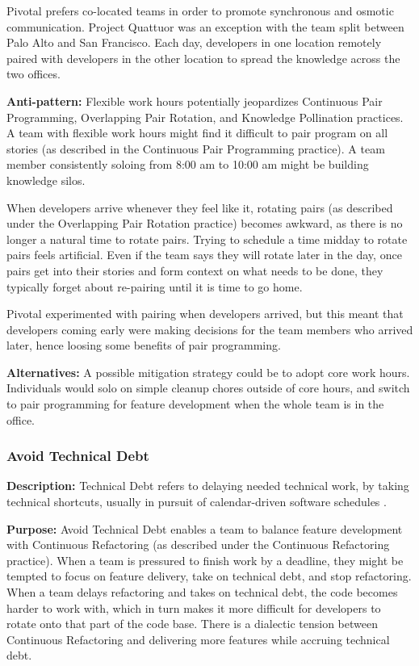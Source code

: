Pivotal prefers co-located teams in order to promote synchronous and osmotic communication. Project Quattuor was an exception with the team split between Palo Alto and San Francisco. Each day, developers in one location remotely paired with developers in the other location to spread the knowledge across the two offices.

\textbf{Anti-pattern:} Flexible work hours potentially jeopardizes Continuous Pair Programming, Overlapping Pair Rotation, and Knowledge Pollination practices. A team with flexible work hours might find it difficult to pair program on all stories (as described in the Continuous Pair Programming practice). A team member consistently soloing from 8:00 am to 10:00 am might be building knowledge silos. 

When developers arrive whenever they feel like it, rotating pairs (as described under the Overlapping Pair Rotation practice) becomes awkward, as there is no longer a natural time to rotate pairs. Trying to schedule a time midday to rotate pairs feels artificial. Even if the team says they will rotate later in the day, once pairs get into their stories and form context on what needs to be done, they typically forget about re-pairing until it is time to go home.

Pivotal experimented with pairing when developers arrived, but this meant that developers coming early were making decisions for the team members who arrived later, hence loosing some benefits of pair programming. 

\textbf{Alternatives:} A possible mitigation strategy could be to adopt core work hours. Individuals would solo on simple cleanup chores outside of core hours, and switch to pair programming for feature development when the whole team is in the office. 

\subsubsection{Avoid Technical Debt}
\textbf{Description:} Technical Debt refers to delaying needed technical work, by taking technical shortcuts, usually in pursuit of calendar-driven software schedules \cite{McConnellTechnicalDebt}. 

\textbf{Purpose:} Avoid Technical Debt enables a team to balance feature development with Continuous Refactoring (as described under the Continuous Refactoring practice). When a team is pressured to finish work by a deadline, they might be tempted to focus on feature delivery, take on technical debt, and stop refactoring. When a team delays refactoring and takes on technical debt, the code becomes harder to work with, which in turn makes it more difficult for developers to rotate onto that part of the code base. There is a dialectic tension \cite{RalphProcessTheories} between Continuous Refactoring and delivering more features while accruing technical debt.


